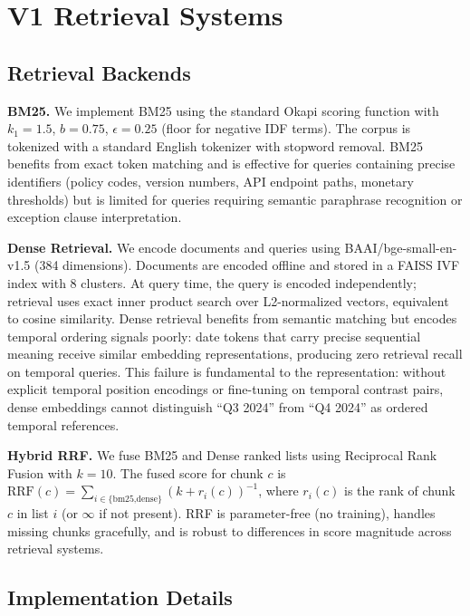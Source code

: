 \documentclass[11pt, a4paper]{article}
\begin{document}
\section{V1 Retrieval Systems}
\label{sec:v1}

\subsection{Retrieval Backends}

\textbf{BM25.} We implement BM25 using the standard Okapi scoring function with $k_1{=}1.5$, $b{=}0.75$, $\epsilon{=}0.25$ (floor for negative IDF terms). The corpus is tokenized with a standard English tokenizer with stopword removal. BM25 benefits from exact token matching and is effective for queries containing precise identifiers (policy codes, version numbers, API endpoint paths, monetary thresholds) but is limited for queries requiring semantic paraphrase recognition or exception clause interpretation.

\textbf{Dense Retrieval.} We encode documents and queries using BAAI/bge-small-en-v1.5 (384 dimensions). Documents are encoded offline and stored in a FAISS IVF index with 8 clusters. At query time, the query is encoded independently; retrieval uses exact inner product search over L2-normalized vectors, equivalent to cosine similarity. Dense retrieval benefits from semantic matching but encodes temporal ordering signals poorly: date tokens that carry precise sequential meaning receive similar embedding representations, producing zero retrieval recall on temporal queries. This failure is fundamental to the representation: without explicit temporal position encodings or fine-tuning on temporal contrast pairs, dense embeddings cannot distinguish ``Q3 2024'' from ``Q4 2024'' as ordered temporal references.

\textbf{Hybrid RRF.} We fuse BM25 and Dense ranked lists using Reciprocal Rank Fusion \citep{cormack2009rrf} with $k{=}10$. The fused score for chunk $c$ is $\text{RRF}(c) = \sum_{i \in \{\text{bm25,dense}\}} (k + r_i(c))^{-1}$, where $r_i(c)$ is the rank of chunk $c$ in list $i$ (or $\infty$ if not present). RRF is parameter-free (no training), handles missing chunks gracefully, and is robust to differences in score magnitude across retrieval systems.

\subsection{Implementation Details}
\end{document}
